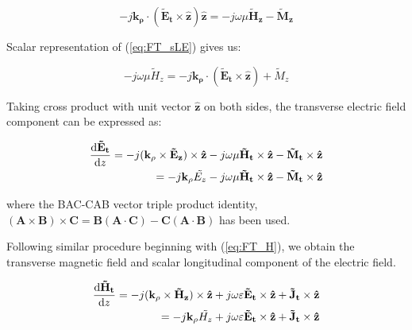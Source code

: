 \documentclass[11pt]{article}
\begin{document}
  \begin{equation}
    -j \mathbf{k_{\rho}} \cdot (\mathbf{\tilde{E}_t} \times \mathbf{\hat{z}})\mathbf{\hat{z}} =
    -j \omega \mu \mathbf{\tilde{H}_z} - \mathbf{\tilde{M}_z}
    \label{eq:FT_sLE}
  \end{equation}

  Scalar representation of (\ref{eq:FT_sLE}) gives us:

  \begin{equation}
    -j \omega \mu \tilde{H}_z =
    -j \mathbf{k_{\rho}} \cdot (\mathbf{\tilde{E}_t} \times \mathbf{\hat{z}}) + {\tilde{M}_z}
    \label{eq:sLH}
  \end{equation}

  Taking cross product with unit vector $\mathbf{\hat{z}}$ on both sides, the transverse electric field component can be expressed as:

  \begin{equation}
    \begin{split}
      \dv{\mathbf{\tilde{E}_t}}{z} = -j (\mathbf{k_{\rho}} \times \mathbf{\tilde{E}_z}) \times \mathbf{\hat{z}}
      -j \omega \mu \mathbf{\tilde{H}_t} \times \mathbf{\hat{z}}  -
      \mathbf{\tilde{M}_t} \times \mathbf{\hat{z}} \\
      = -j \mathbf{k_{\rho}} \tilde{{E}_z} -j \omega \mu \mathbf{\tilde{H}_t} \times \mathbf{\hat{z}}  -
      \mathbf{\tilde{M}_t} \times \mathbf{\hat{z}}
    \end{split}
    \label{eq:dFT_ET}
  \end{equation}

  where the BAC-CAB vector triple product identity, $(\mathbf{A} \times \mathbf{B})\times\mathbf{C} = \mathbf{B}(\mathbf{A} \cdot \mathbf{C}) - \mathbf{C}(\mathbf{A} \cdot \mathbf{B})$ has been used.

  Following similar procedure beginning with (\ref{eq:FT_H}), we obtain the transverse magnetic field and scalar longitudinal component of the electric field.

  \begin{equation}
    \begin{split}
      \dv{\mathbf{\tilde{H}_t}}{z} = -j (\mathbf{k_{\rho}} \times \mathbf{\tilde{H}_z}) \times \mathbf{\hat{z}}
      + j \omega \varepsilon \mathbf{\tilde{E}_t} \times \mathbf{\hat{z}} +
      \mathbf{\tilde{J}_t} \times \mathbf{\hat{z}} \\
      = -j \mathbf{k_{\rho}} \tilde{{H}_z} + j \omega \varepsilon \mathbf{\tilde{E}_t} \times \mathbf{\hat{z}}  +
      \mathbf{\tilde{J}_t} \times \mathbf{\hat{z}}
    \end{split}
    \label{eq:dFT_HT}
  \end{equation}
\end{document}
